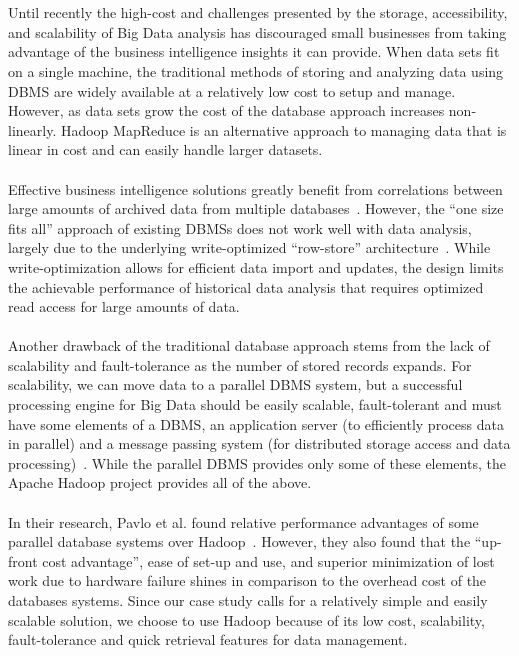 \documentclass[letterpaper,12pt,titlepage]{article}
\begin{document}
\\\\
Until recently the high-cost and challenges presented by the storage,
accessibility, and scalability of Big Data analysis has discouraged small
businesses from taking advantage of the business intelligence insights it
can provide. When data sets fit on a single machine, the traditional methods of
storing and analyzing data using DBMS are widely available at a relatively low
cost to setup and manage. However, as data sets grow the cost of the database
approach increases non-linearly. Hadoop MapReduce is an alternative approach to
managing data that is linear in cost and can easily handle larger datasets.
\\\\
Effective business intelligence solutions greatly benefit from correlations
between large amounts of archived data from multiple
databases~\cite{gupta}\cite{stonebraker}. However, the ``one size fits all''
approach of existing DBMSs does not work well with data analysis, largely
due to the underlying write-optimized ``row-store''
architecture~\cite{stonebraker}.
While write-optimization allows for efficient data import and updates, the
design limits the achievable performance of historical data analysis that
requires optimized read access for large amounts of data. 
\\\\
Another drawback of the traditional database approach stems from the lack of
scalability and fault-tolerance as the number of stored records expands. For
scalability, we can move data to a parallel DBMS system, but a successful
processing engine for Big Data should be easily scalable, fault-tolerant and
must have some elements of a DBMS, an application server (to efficiently process
data in parallel) and a message passing system (for distributed storage access
and data processing)~\cite{gupta}\cite{stonebraker}. While the parallel DBMS
provides only some of these elements, the Apache Hadoop project provides all of
the above.
\\\\
In their research, Pavlo et al. found relative performance advantages of some
parallel database systems over Hadoop~\cite{pavlo}. However, they also found
that the ``up-front cost advantage'', ease of set-up and use, and superior
minimization of lost work due to hardware failure shines in comparison to the
overhead cost of the databases systems. Since our case study calls for a
relatively simple and easily scalable solution, we choose to use Hadoop because
of its low cost, scalability, fault-tolerance and quick retrieval features for
data management.
\end{document}
